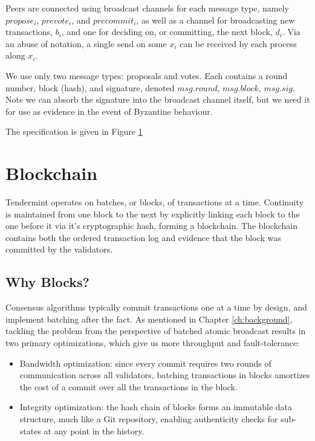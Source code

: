 Peers are connected using broadcast channels for each message type,
namely $propose_i$, $prevote_i$, and $precommit_i$,
as well as a channel for broadcasting new transactions, $b_i$,
and one for deciding on, or committing, the next block, $d_i$.
Via an abuse of notation, a single send on some $x_i$ can be received by each process along
$x_i$.

We use only two message types: proposals and votes. 
Each contains a round number, block (hash), and signature, 
denoted $msg.round$, $msg.block$, $msg.sig$.
Note we can absorb the signature into the broadcast channel itself,
but we need it for use as evidence in the event of Byzantine behaviour.

The specification is given in Figure \ref{fig:tendermint-pi}

\begin{figure}[]
	
	\label{fig:tendermint-pi}
\end{figure}

\section{Blockchain}

Tendermint operates on batches, or blocks, of transactions at a time.
Continuity is maintained from one block to the next by explicitly linking each block to the one before it 
via it's cryptographic hash, forming a blockchain. 
The blockchain contains both the ordered transaction log and evidence that the block was committed 
by the validators.

\subsection{Why Blocks?}
Consensus algorithms typically commit transactions one at a time by design, 
and implement batching after the fact.
As mentioned in Chapter \ref{ch:background}, 
tackling the problem from the perspective of batched atomic broadcast
results in two primary optimizations, which give us more throughput and fault-tolerance:

\begin{itemize}
\item{Bandwidth optimization: since every commit requires two rounds of communication across all validators, 
	batching transactions in blocks amortizes the cost of a commit over all the transactions in the block.}
\item{Integrity optimization: the hash chain of blocks forms an immutable data structure, much like a Git repository, enabling authenticity checks for sub-states at any point in the history.}
\end{itemize}

